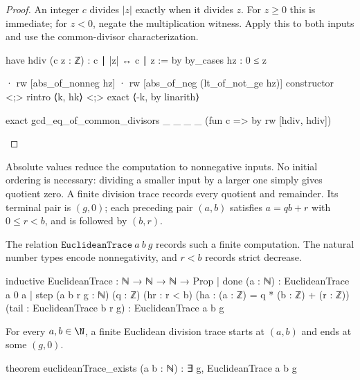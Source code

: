 \begin{proof}

  An integer $c$ divides $|z|$ exactly when it divides $z$. For $z\ge0$ this is immediate; for $z<0$, negate the multiplication witness. Apply this to both inputs and use the common-divisor characterization.

  \begin{lean}
    have hdiv (c z : ℤ) : c ∣ |z| ↔ c ∣ z := by
      by_cases hz : 0 ≤ z

      · rw [abs_of_nonneg hz]
      · rw [abs_of_neg (lt_of_not_ge hz)]
        constructor <;> rintro ⟨k, hk⟩ <;> exact ⟨-k, by linarith⟩

    exact gcd_eq_of_common_divisors _ _ _ _ (fun c => by rw [hdiv, hdiv])
  \end{lean}

\end{proof}

Absolute values reduce the computation to nonnegative inputs. No initial
ordering is necessary: dividing a smaller input by a larger one simply gives
quotient zero. A finite division trace records every quotient and remainder.
Its terminal pair is $(g,0)$; each preceding pair $(a,b)$ satisfies
$a=qb+r$ with $0\le r<b$, and is followed by $(b,r)$.

\begin{definition}
  The relation $\texttt{EuclideanTrace}\ a\ b\ g$ records such a finite computation. The natural number types encode nonnegativity, and $r<b$ records strict decrease.

  \begin{lean}
    inductive EuclideanTrace : ℕ → ℕ → ℕ → Prop
      | done (a : ℕ) : EuclideanTrace a 0 a
      | step (a b r g : ℕ) (q : ℤ) (hr : r < b)
          (ha : (a : ℤ) = q * (b : ℤ) + (r : ℤ))
          (tail : EuclideanTrace b r g) : EuclideanTrace a b g
  \end{lean}
\end{definition}

\begin{theorem} \label{nt:thm:euclidean-termination}
  For every $a,b\in\N$, a finite Euclidean division trace starts at $(a,b)$ and ends at some $(g,0)$.

  \begin{lean}
    theorem euclideanTrace_exists (a b : ℕ) : ∃ g, EuclideanTrace a b g
  \end{lean}
\end{theorem}

